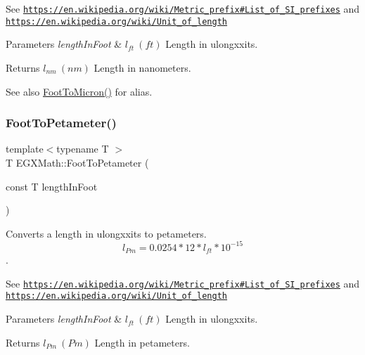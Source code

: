 See \href{https://en.wikipedia.org/wiki/Metric_prefix#List_of_SI_prefixes}{\tt https\+://en.\+wikipedia.\+org/wiki/\+Metric\+\_\+prefix\#\+List\+\_\+of\+\_\+\+S\+I\+\_\+prefixes} and \href{https://en.wikipedia.org/wiki/Unit_of_length}{\tt https\+://en.\+wikipedia.\+org/wiki/\+Unit\+\_\+of\+\_\+length} 
\begin{DoxyParams}{Parameters}
{\em length\+In\+Foot} & $ l_{ft}\ (ft)$ Length in ulongxxits. \\
\hline
\end{DoxyParams}
\begin{DoxyReturn}{Returns}
$ l_{nm}\ (nm)$ Length in nanometers. 
\end{DoxyReturn}
\begin{DoxySeeAlso}{See also}
\mbox{\hyperlink{group___e_g_x_math-_conversions-_length_conversions-_imperial-_foot-_non-_s_i_ga0360d043c5150d90e61ad28c1fb81cc1}{Foot\+To\+Micron()}} for alias. 
\end{DoxySeeAlso}
\mbox{\label{group___e_g_x_math-_conversions-_length_conversions-_imperial-_foot-_s_i_ga6f7eedec51b5247e174460561bf4707b}} 
\subsubsection{\texorpdfstring{Foot\+To\+Petameter()}{FootToPetameter()}}
{\footnotesize\ttfamily template$<$typename T $>$ \\
T E\+G\+X\+Math\+::\+Foot\+To\+Petameter (\begin{DoxyParamCaption}\item[{const T}]{length\+In\+Foot }\end{DoxyParamCaption})}



Converts a length in ulongxxits to petameters. \[ l_{Pm}=0.0254 * 12 * l_{ft} * 10^{-15} \]. 

See \href{https://en.wikipedia.org/wiki/Metric_prefix#List_of_SI_prefixes}{\tt https\+://en.\+wikipedia.\+org/wiki/\+Metric\+\_\+prefix\#\+List\+\_\+of\+\_\+\+S\+I\+\_\+prefixes} and \href{https://en.wikipedia.org/wiki/Unit_of_length}{\tt https\+://en.\+wikipedia.\+org/wiki/\+Unit\+\_\+of\+\_\+length} 
\begin{DoxyParams}{Parameters}
{\em length\+In\+Foot} & $ l_{ft}\ (ft)$ Length in ulongxxits. \\
\hline
\end{DoxyParams}
\begin{DoxyReturn}{Returns}
$ l_{Pm}\ (Pm)$ Length in petameters. 
\end{DoxyReturn}
\mbox{\label{group___e_g_x_math-_conversions-_length_conversions-_imperial-_foot-_s_i_ga2d46da89e13218f0c8d75356c0d03942}} 
